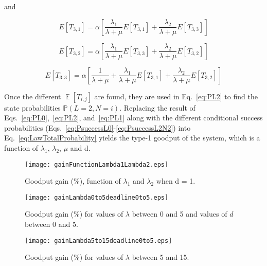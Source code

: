 \documentclass[preprint,12pt]{elsarticle}
\theoremstyle{definition}
\theoremstyle{plain}
\theoremstyle{remark}
\renewcommand{\P}{\ensuremath{\mathbb{P}}}
\DeclareMathOperator{\E}{\mathbb{E}}
\begin{document}
 and

     \begin{equation} \label{eq:ET31set}
    E[T_{3,1}] = \alpha\left[\frac{\lambda_{1}}{\lambda + \mu} E[T_{3,1}] +  \frac{\lambda_{2}}{\lambda + \mu} E[T_{3,3}]\right]
    \end{equation}

    \begin{equation}\label{eq:ET32set}
    E[T_{3,2}] = \alpha\left[\frac{\lambda_{1}}{\lambda + \mu} E[T_{3,3}] +  \frac{\lambda_{2}}{\lambda + \mu} E[T_{3,2}] \right]
    \end{equation}

    \begin{equation} \label{eq:ET33set}
    E[T_{3,3}] = \alpha\left[\frac{1}{\lambda + \mu} + \frac{\lambda_{1}}{\lambda + \mu}E[T_{3,1}] +  \frac{\lambda_{2}}{\lambda + \mu} E[T_{3,2}] \right]
    \end{equation}


Once the different $\E[T_{i,j}]$ are found, they are used in Eq.~\eqref{eq:PL2} to find the state probabilities $\P(L=2,N=i)$. Replacing the result of Eqs.~\eqref{eq:PL0},~\eqref{eq:PL2}, and~\eqref{eq:PL1} along with the different conditional success probabilities (Eqs.~\eqref{eq:PsuccessL0}-\eqref{eq:PsuccessL2N2}) into Eq.~\eqref{eq:LawTotalProbability} yields the type-1 goodput of the system, which is a function of $\lambda_{1}$, $\lambda_{2}$, $\mu$ and d. 

\begin{figure}[t]
\begin{center}
  \texttt{[image: gainFunctionLambda1Lambda2.eps]}
\end{center}
  \caption{Goodput gain (\%), function of $\lambda_{1}$ and $\lambda_{2}$ when d = 1.}
  \label{fig:gainFunctionLambda1Lambda2}
\end{figure}


\begin{figure}[t]
\begin{center}
  \texttt{[image: gainLambda0to5deadline0to5.eps]}
\end{center}
  \caption{Goodput gain (\%) for values of $\lambda$ between 0 and 5 and values of $d$ between 0 and 5.}
  \label{fig:gainLambda0to5deadline0to5}
\end{figure}

\begin{figure}[t]
\begin{center}
  \texttt{[image: gainLambda5to15deadline0to5.eps]}
\end{center}
  \caption{Goodput gain (\%) for values of $\lambda$ between 5 and 15.}
  \label{fig:gainLambda5to15deadline0to5}
\end{figure}
\end{document}
